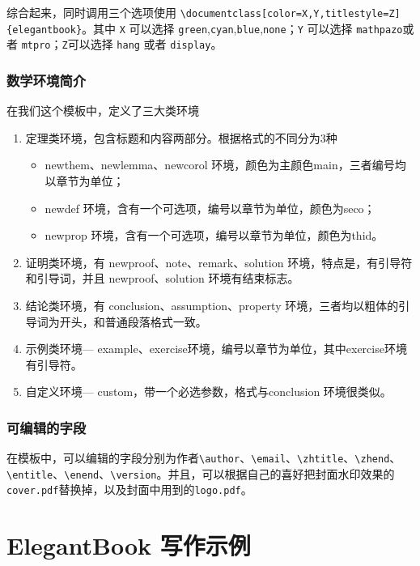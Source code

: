 \documentclass[color=green,mathpazo,titlestyle=hang,11pt]{elegantbook}
\begin{document}
综合起来，同时调用三个选项使用 \verb|\documentclass[color=X,Y,titlestyle=Z]{elegantbook}|。其中 \verb|X| 可以选择 \verb|green|,\verb|cyan|,\verb|blue|,\verb|none|；\verb|Y| 可以选择 \verb|mathpazo|或者 \verb|mtpro|；\verb|Z|可以选择 \verb|hang| 或者 \verb|display|。

\subsection{数学环境简介}
在我们这个模板中，定义了三大类环境
\begin{enumerate}
\item 定理类环境，包含标题和内容两部分。根据格式的不同分为3种
\begin{itemize}
\item {\color{main} newthem、newlemma、newcorol} 环境，颜色为主颜色main，三者编号均以章节为单位；
\item {\color{main} newdef} 环境，含有一个可选项，编号以章节为单位，颜色为seco；
\item {\color{main} newprop} 环境，含有一个可选项，编号以章节为单位，颜色为thid。
\end{itemize}
\item 证明类环境，有  {\color{main} newproof、note、remark、solution} 环境，特点是，有引导符和引导词，并且 newproof、solution 环境有结束标志。
\item 结论类环境，有 {\color{main}  conclusion、assumption、property} 环境，三者均以粗体的引导词为开头，和普通段落格式一致。
\item 示例类环境--- {\color{main} example、exercise}环境，编号以章节为单位，其中exercise环境有引导符。
\item 自定义环境--- {\color{main} custom}，带一个必选参数，格式与conclusion 环境很类似。
\end{enumerate}

\subsection{可编辑的字段}
在模板中，可以编辑的字段分别为作者\verb|\author|、\verb|\email|、\verb|\zhtitle|、\verb|\zhend|、\verb|\entitle|、\verb|\enend|、\verb|\version|。并且，可以根据自己的喜好把封面水印效果的\verb|cover.pdf|替换掉，以及封面中用到的\verb|logo.pdf|。

\chapter{ElegantBook 写作示例}
\end{document}
